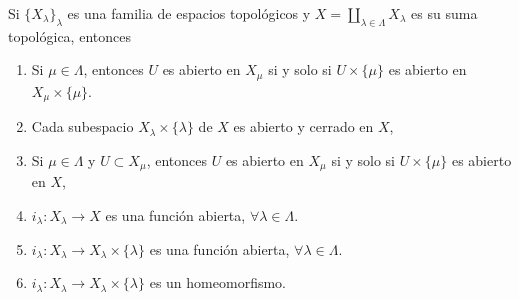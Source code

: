 

\begin{theorem}
Si $\{ X_{\lambda} \}_{\lambda}$ es una familia de espacios topológicos y $X = \coprod_{\lambda \in \Lambda} X_{\lambda}$ es su suma topológica, entonces
\begin{enumerate}[label=\textnormal{(\roman*)}, align=left, labelwidth=1.7em, leftmargin=3.0em]
\item Si $\mu \in \Lambda$, entonces $U$ es abierto en $X_{\mu}$ si y solo si $U \times \{ \mu \}$ es abierto en $X_{\mu} \times \{ \mu \}$.
\item Cada subespacio $X_{\lambda} \times \{ \lambda \}$ de $X$ es abierto y cerrado en $X$,
\item Si $\mu \in \Lambda$ y $U \subset X_{\mu}$, entonces $U$ es abierto en $X_{\mu}$ si y solo si $U \times \{ \mu \}$ es abierto en $X$,
\item $i_{\lambda} : X_{\lambda} \longrightarrow X$ es una función abierta, $\forall \lambda \in \Lambda$.
\item $i_{\lambda} : X_{\lambda} \longrightarrow X_{\lambda} \times \{ \lambda \}$ es una función abierta, $\forall \lambda \in \Lambda$.
\item $i_{\lambda} : X_{\lambda} \longrightarrow X_{\lambda} \times \{ \lambda \}$ es un homeomorfismo.
\end{enumerate}
\end{theorem}

